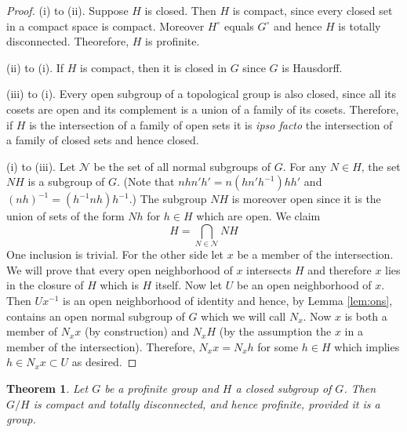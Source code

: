 \documentclass[12pt]{article}
\newtheorem{thm}{Theorem}[section]
\theoremstyle{definition}
\theoremstyle{remark}
\newcommand*{\nor}{\mathcal{N}}
\newcommand{\gcirc}{G^\circ}
\begin{document}
    \begin{proof}
        (i) to (ii). Suppose $H$ is closed. Then $H$ is compact, since every closed set in a compact space is compact. Moreover $H^\circ$ equals $\gcirc$ and hence $H$ is totally disconnected. Theorefore, $H$ is profinite.

        (ii) to (i). If $H$ is compact, then it is closed in $G$ since $G$ is Hausdorff.

        (iii) to (i). Every open subgroup of a topological group is also closed, since all its cosets are open and its complement is a union of a family of its cosets. Therefore, if $H$ is the intersection of a family of open sets it is \emph{ipso facto} the intersection of a family of closed sets and hence closed.

        (i) to (iii). Let $\nor$ be the set of all normal subgroups of $G$. For any $N\in H$, the set $NH$ is a subgroup of $G$. (Note that $nhn'h'=n(hn'h^{-1})hh'$ and $(nh)^{-1}=(h^{-1}nh)h^{-1}$.) The subgroup $NH$ is moreover open since it is the union of sets of the form $Nh$ for $h\in H$ which are open. We claim
        $$ H = \bigcap_{N\in\nor} NH $$
        One inclusion is trivial. For the other side let $x$ be a member of the intersection. We will prove that every open neighborhood of $x$ intersects $H$ and therefore $x$ lies in the closure of $H$ which is $H$ itself. Now let $U$ be an open neighborhood of $x$. Then $Ux^{-1}$ is an open neighborhood of identity and hence, by Lemma \ref{lem:ons}, contains an open normal subgroup of $G$ which we will call $N_x$. Now $x$ is both a member of $N_xx$ (by construction) and $N_xH$ (by the assumption the $x$ in a member of the intersection). Therefore, $N_xx=N_xh$ for some $h\in H$ which implies $h\in N_xx\subset U$ as desired.
    \end{proof}

    \begin{thm}
        Let $G$ be a profinite group and $H$ a closed subgroup of $G$. Then $G/H$ is compact and totally disconnected, and hence profinite, provided it is a group.
    \end{thm}
\end{document}
